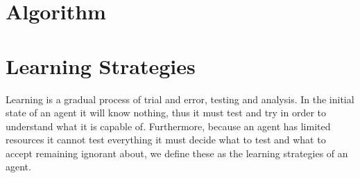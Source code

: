 \documentclass[master.tex]{subfiles}
\begin{document}
	\section{Algorithm} \label{sec:Algorithm}
		

	\begin{comment}

	    \section*{Sec1}

	    Learning has two important steps to it, the first is figuring out
	    what to do in order to learn about something and the second is analysis
	    of what occured to understand and actually learn about it.


	    Analysing an outcome is about figuring out what occured and what did
	    not occur. For instance if one pressed

	    In a STRIPS domain, all actions are absolute thus we know that if
	    an action changed the state then the action's preconditions was satisfied
	    and all predicates added
    \end{comment}



    \section*{Learning Strategies} \label{sec:strats}

    Learning is a gradual process of trial and error, testing and analysis.
    In the initial state of an agent it will know nothing, thus it must
    test and try in order to understand what it is capable of. Furthermore, because an agent has limited resources it cannot test everything it must decide what to test and what to accept remaining ignorant about, we define these as the learning strategies of an agent.
\end{document}
